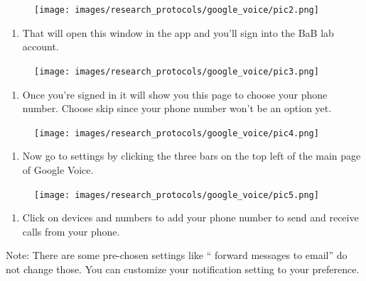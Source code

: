 \documentclass[
]{book}
\providecommand{\tightlist}{%
  \setlength{\itemsep}{0pt}\setlength{\parskip}{0pt}}
\begin{document}
\begin{figure}
\centering
\texttt{[image: images/research\_protocols/google\_voice/pic2.png]}
\caption{}
\end{figure}

\begin{enumerate}
\def\labelenumi{\arabic{enumi})}
\setcounter{enumi}{2}
\tightlist
\item
  That will open this window in the app and you'll sign into the BaB lab account.
\end{enumerate}

\begin{figure}
\centering
\texttt{[image: images/research\_protocols/google\_voice/pic3.png]}
\caption{}
\end{figure}

\begin{enumerate}
\def\labelenumi{\arabic{enumi})}
\setcounter{enumi}{3}
\tightlist
\item
  Once you're signed in it will show you this page to choose your phone number. Choose skip since your phone number won't be an option yet.
\end{enumerate}

\begin{figure}
\centering
\texttt{[image: images/research\_protocols/google\_voice/pic4.png]}
\caption{}
\end{figure}

\begin{enumerate}
\def\labelenumi{\arabic{enumi})}
\setcounter{enumi}{4}
\tightlist
\item
  Now go to settings by clicking the three bars on the top left of the main page of Google Voice.
\end{enumerate}

\begin{figure}
\centering
\texttt{[image: images/research\_protocols/google\_voice/pic5.png]}
\caption{}
\end{figure}

\begin{enumerate}
\def\labelenumi{\arabic{enumi})}
\setcounter{enumi}{5}
\tightlist
\item
  Click on devices and numbers to add your phone number to send and receive calls from your phone.
\end{enumerate}

Note: There are some pre-chosen settings like `` forward messages to email'' do not change those. You can customize your notification setting to your preference.
\end{document}
